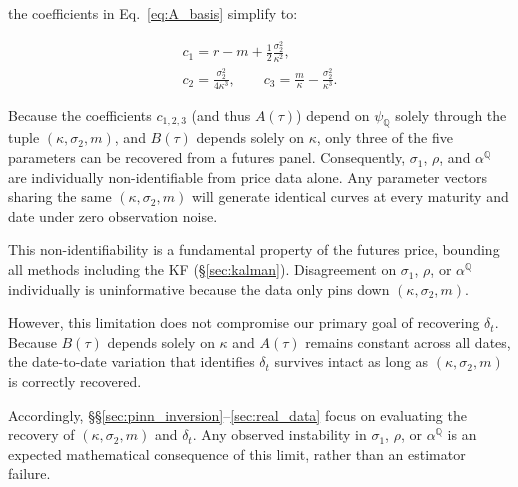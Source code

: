 \documentclass[sigconf, authorversion=true, nonacm=true]{acmart}
\newcommand{\meanrev}{\kappa}               %
\newcommand{\longrun}{\alpha}               %
\begin{document}
the coefficients in Eq.~\ref{eq:A_basis} simplify to:

\begin{equation}
  \label{eq:A_coeffs}
  \begin{gathered}
    c_1 = r - m + \frac{1}{2}\frac{\sigma_2^2}{\meanrev^2}, \\
    c_2 = \frac{\sigma_2^2}{4\meanrev^3},
    \qquad
    c_3 = \frac{m}{\meanrev} - \frac{\sigma_2^2}{\meanrev^3}.
  \end{gathered}
\end{equation}

Because the coefficients $c_{1,2,3}$ (and thus $A(\tau)$) depend on $\psi_{\mathbb{Q}}$ solely through the tuple $(\kappa, \sigma_2, m)$, and $B(\tau)$ depends solely on $\kappa$, only three of the five parameters can be recovered from a futures panel. Consequently, $\sigma_1$, $\rho$, and $\longrun^{\mathbb{Q}}$ are individually non-identifiable from price data alone. Any parameter vectors sharing the same $(\kappa, \sigma_2, m)$ will generate identical curves at every maturity and date under zero observation noise.

This non-identifiability is a fundamental property of the futures price, bounding all methods including the KF (\S\ref{sec:kalman}). Disagreement on $\sigma_1$, $\rho$, or $\longrun^{\mathbb{Q}}$ individually is uninformative because the data only pins down $(\kappa,\sigma_2,m)$.

However, this limitation does not compromise our primary goal of recovering $\delta_t$. Because $B(\tau)$ depends solely on $\kappa$ and $A(\tau)$ remains constant across all dates, the date-to-date variation that identifies $\delta_t$ survives intact as long as $(\kappa, \sigma_2, m)$ is correctly recovered. 

Accordingly, \S\S\ref{sec:pinn_inversion}--\ref{sec:real_data} focus on evaluating the recovery of $(\kappa,\sigma_2,m)$ and $\delta_t$. Any observed instability in $\sigma_1$, $\rho$, or $\longrun^{\mathbb{Q}}$ is an expected mathematical consequence of this limit, rather than an estimator failure.
\end{document}
